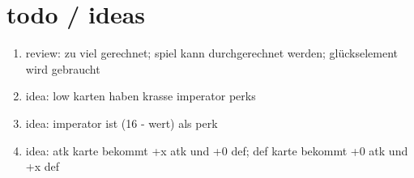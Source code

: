 \documentclass[a4paper,12pt]{article}
\numberwithin{equation}{section}
\begin{document}
\newpage
\section{todo / ideas}
\begin{enumerate}[label=--]
        \item review: zu viel gerechnet; spiel kann durchgerechnet werden; glückselement wird gebraucht
        \item idea: low karten haben krasse imperator perks
        \item idea: imperator ist (16 - wert) als perk
        \item idea: atk karte bekommt +x atk und +0 def; def karte bekommt +0 atk und +x def
\end{enumerate}

\end{document}
